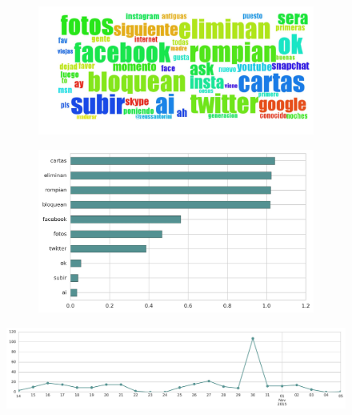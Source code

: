 \begin{figure}[htbp!]
    \centering
    \begin{subfigure}[b]{0.49\textwidth}
        \includegraphics[width=\textwidth]{twitter_all/report_images/topic-06-wordcloud.jpg}
    \end{subfigure}
    \begin{subfigure}[b]{0.49\textwidth}
        \includegraphics[width=\textwidth]{twitter_all/report_images/topic-06-terms.jpg}
    \end{subfigure}
\end{figure}

\begin{figure}[htbp!]
    \centering
    \includegraphics[width=\textwidth]{twitter_all/report_images/topic-06-timeseries.jpg}
\end{figure}

